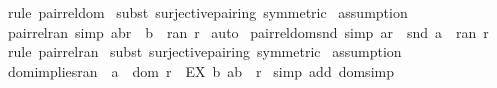 \begin{isabellebody}
%
\isadelimproof
%
\endisadelimproof
%
\isatagproof
{}\isamarkupfalse%
\ {\isacharparenleft}rule\ pair{\isacharunderscore}rel{\isacharunderscore}dom{\isacharparenright}\isanewline
{}\isamarkupfalse%
\ {\isacharparenleft}subst\ surjective{\isacharunderscore}pairing\ {\isacharbrackleft}symmetric{\isacharbrackright}{\isacharparenright}\isanewline
{}\isamarkupfalse%
\ assumption\isanewline
{}\isamarkupfalse%
%
\endisatagproof
{\isafoldproof}%
%
\isadelimproof
\isanewline
%
\endisadelimproof
\isanewline
{}\isamarkupfalse%
\ pair{\isacharunderscore}rel{\isacharunderscore}ran\ {\isacharbrackleft}simp{\isacharbrackright}{\isacharcolon}\ {\isachardoublequoteopen}{\isacharparenleft}a{\isacharcomma}b{\isacharparenright}{\isacharcolon}r\ {\isacharequal}{\isacharequal}{\isachargreater}\ b\ {\isacharcolon}\ ran\ r{\isachardoublequoteclose}\isanewline
%
\isadelimproof
%
\endisadelimproof
%
\isatagproof
{}\isamarkupfalse%
\ auto\isanewline
{}\isamarkupfalse%
%
\endisatagproof
{\isafoldproof}%
%
\isadelimproof
\isanewline
%
\endisadelimproof
\isanewline
{}\isamarkupfalse%
\ pair{\isacharunderscore}rel{\isacharunderscore}dom{\isacharunderscore}snd\ {\isacharbrackleft}simp{\isacharbrackright}{\isacharcolon}\ {\isachardoublequoteopen}a{\isacharcolon}r\ {\isacharequal}{\isacharequal}{\isachargreater}\ snd\ a\ {\isacharcolon}\ ran\ r{\isachardoublequoteclose}\isanewline
%
\isadelimproof
%
\endisadelimproof
%
\isatagproof
{}\isamarkupfalse%
\ {\isacharparenleft}rule\ pair{\isacharunderscore}rel{\isacharunderscore}ran{\isacharparenright}\isanewline
{}\isamarkupfalse%
\ {\isacharparenleft}subst\ surjective{\isacharunderscore}pairing\ {\isacharbrackleft}symmetric{\isacharbrackright}{\isacharparenright}\isanewline
{}\isamarkupfalse%
\ assumption\isanewline
{}\isamarkupfalse%
%
\endisatagproof
{\isafoldproof}%
%
\isadelimproof
\isanewline
%
\endisadelimproof
\isanewline
{}\isamarkupfalse%
\ dom{\isacharunderscore}implies{\isacharunderscore}ran\ {\isacharcolon}\ {\isachardoublequoteopen}a\ {\isacharcolon}\ dom\ r\ {\isacharequal}{\isacharequal}{\isachargreater}\ {\isacharparenleft}EX\ b{\isachardot}\ {\isacharparenleft}a{\isacharcomma}b{\isacharparenright}\ {\isacharcolon}\ r{\isacharparenright}{\isachardoublequoteclose}\isanewline
%
\isadelimproof
%
\endisadelimproof
%
\isatagproof
{}\isamarkupfalse%
\ {\isacharparenleft}simp\ add{\isacharcolon}\ dom{\isacharunderscore}simp{\isacharparenright}\isanewline

\end{isabellebody}
